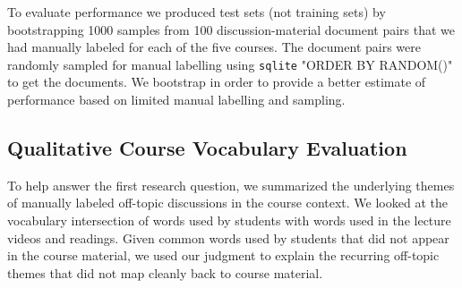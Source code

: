 \documentclass[sigconf, anonymous]{acmart}
\begin{document}
To evaluate performance we produced test sets (not training sets) by bootstrapping 1000 samples from 100 discussion-material document pairs that we had manually labeled for each of the five courses. 
The document pairs were randomly sampled for manual labelling using \texttt{sqlite} "ORDER BY RANDOM()" to get the documents.
We bootstrap in order to provide a better estimate of performance based on limited manual labelling and sampling.

\subsection{Qualitative Course Vocabulary Evaluation}
To help answer the first research question, we summarized the underlying themes of manually labeled off-topic discussions in the course context.
We looked at the vocabulary intersection of words used by students with words used in the lecture videos and readings.
Given common words used by students that did not appear in the course material, we used our judgment to explain the recurring off-topic themes that did not map cleanly back to course material.

\end{document}
